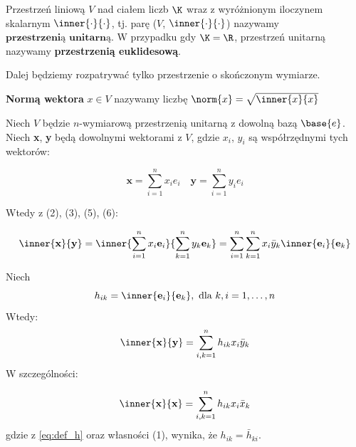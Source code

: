 \begin{definition}
Przestrzeń liniową $V$ nad ciałem liczb $\K$ wraz z wyróżnionym iloczynem skalarnym $\inner{\cdot}{\cdot}$, tj. parę ($V$, $\inner{\cdot}{\cdot}$) nazywamy $\textbf{przestrzenią unitarną}$.
W przypadku gdy $\K = \R$, przestrzeń unitarną nazywamy \textbf{przestrzenią euklidesową}.
\end{definition}

Dalej będziemy rozpatrywać tylko przestrzenie o skończonym wymiarze.

\begin{definition}
    \textbf{Normą wektora} $x \in V$ nazywamy liczbę $\norm{x} = \sqrt{\inner{x}{x}}$ 
\end{definition}

Niech $V$ będzie $n$-wymiarową przestrzenią unitarną z dowolną bazą $\base{e}$. Niech \textbf{x}, \textbf{y} będą dowolnymi wektorami z $V$, gdzie $x_i$, $y_i$ są współrzędnymi tych wektorów:

\begin{center}
    $$\textbf{x} = \sum_{i=1}^{n}{x_{i}e_{i}} \quad \textbf{y} = \sum_{i=1}^{n}{y_{i}e_{i}}$$
\end{center}
Wtedy z (2), (3), (5), (6):
\begin{center}
    $$\inner{\textbf{x}}{\textbf{y}} = \inner{
        \sum_{i=1}^{n}{x_{i} \textbf{e}_i}
    }{
        \sum_{k=1}^{n}{y_{k} \textbf{e}_k}
    } = \sum_{i=1}^{n}{\sum_{k=1}^{n}{x_{i} \bar{y}_{k} \inner{\textbf{e}_{i}}{\textbf{e}_{k}}}}$$
\end{center}
Niech
\begin{equation}\label{eq:def_h}
    h_{ik} = \inner{\textbf{e}_i}{\textbf{e}_k}, \text{ dla }k,i = 1, \ldots, n 
\end{equation}
Wtedy: 
\begin{equation}\label{eq:std_inner}
    \inner{\textbf{x}}{\textbf{y}} = \sum_{i,k=1}^{n}{h_{ik} x_{i} \bar{y}_{k}}
\end{equation}
W szczególności:

\begin{equation}
    \inner{\textbf{x}}{\textbf{x}} = \sum_{i,k=1}^{n}{h_{ik} x_{i} \bar{x}_{k}}
\end{equation}
gdzie z \eqref{eq:def_h} oraz własności (1), wynika, że $h_{ik} = \bar{h}_{ki}$.


